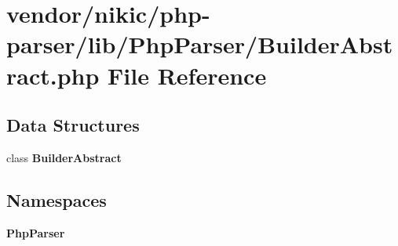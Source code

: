\section{vendor/nikic/php-\/parser/lib/\+Php\+Parser/\+Builder\+Abstract.php File Reference}
\label{_builder_abstract_8php}
\subsection*{Data Structures}
\begin{DoxyCompactItemize}
\item 
class {\bf Builder\+Abstract}
\end{DoxyCompactItemize}
\subsection*{Namespaces}
\begin{DoxyCompactItemize}
\item 
 {\bf Php\+Parser}
\end{DoxyCompactItemize}
